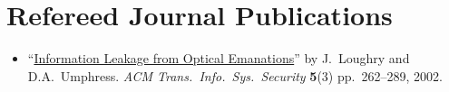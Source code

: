 \section*{Refereed Journal Publications}
\vspace{-2mm}

\begin{itemize}
	\item ``\href{http://dl.acm.org/citation.cfm?doid=545186.545189}{Information
		Leakage from Optical Emanations}'' by J.\ Loughry and D.A.\ Umphress.
		\emph{ACM Trans.\ Info.\ Sys.\ Security} \textbf{5}(3)
		pp.\ 262--289, 2002.
\end{itemize}

